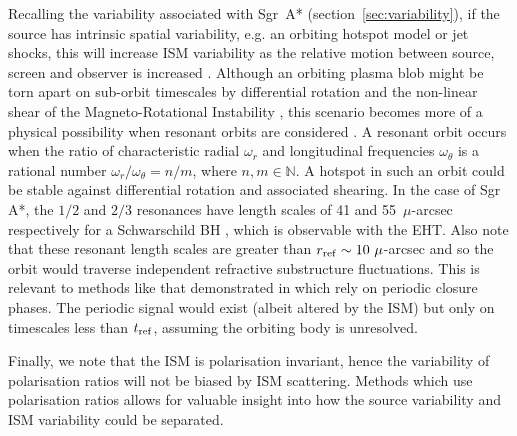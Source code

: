 Recalling the variability associated with Sgr~A* (section~\ref{sec:variability}), if the source has intrinsic spatial variability, e.g. an orbiting hotspot model \citep{Doeleman_2009} or jet shocks, this will increase ISM variability as the relative motion between source, screen and observer is increased \citep{Blecher_2016}. Although an orbiting plasma blob might be torn apart on sub-orbit timescales by differential rotation and the non-linear shear of the Magneto-Rotational Instability \citep[(MRI)][]{Balbus_1991}, this scenario becomes more of a physical possibility when resonant orbits are considered \citep{Brink_2015}. A resonant orbit occurs when the ratio of characteristic radial $\omega_r$ and longitudinal frequencies $\omega_\theta$ is a rational number $\omega_r/\omega_\theta = n/m$, where $n,m \in \mathbb{N}$. A hotspot in such an orbit could be stable against differential rotation and associated shearing. In the case of Sgr A*, the $1/2$ and $2/3$ resonances have  length scales of 41 and 55~$\mu$-arcsec respectively for a Schwarschild BH \citep{Brink_2015}, which is observable with the EHT. Also note that these resonant length scales are greater than $r_{\rm ref} \sim 10\ \mu$-arcsec and so the orbit would traverse independent refractive substructure fluctuations. This is relevant to methods like that demonstrated in \citet{Doeleman_2009} which rely on periodic closure phases. The periodic signal would exist (albeit altered by the ISM) but only on timescales less than $t_{\rm ref}$, assuming the orbiting body is unresolved.


Finally, we note that the ISM is polarisation invariant, hence the variability of polarisation ratios will not be biased by ISM scattering. Methods which use polarisation ratios \citep[e.g.][]{Johnson_2014} allows for valuable insight into how the source variability and ISM variability could be separated.



